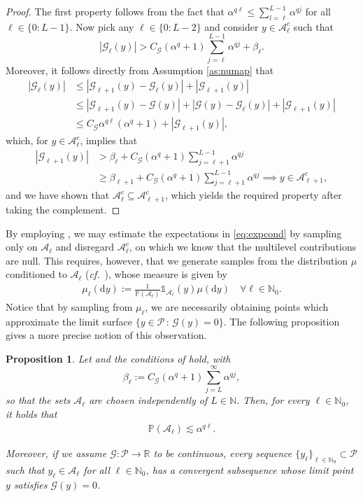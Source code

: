 \documentclass{article}
\newtheorem{proposition}[theorem]{Proposition}
\newcommand{\cA}{\mathcal{A}}
\newcommand{\cG}{\mathcal{G}}
\newcommand{\cP}{\mathcal{P}}
\newcommand{\IN}{\mathbb{N}}
\newcommand{\IP}{\mathbb{P}}
\newcommand{\IR}{\mathbb{R}}
\newcommand{\bOne}{\mathds{1}}
\renewcommand{\d}{{\text{d}}}
\newcommand{\abs}[1]{{\left\vert #1 \right\vert}}
\theoremstyle{definition}
\begin{document}
\begin{proof}
  The first property follows from the fact that $\alpha^{q\ell}\leq\sum_{l=\ell}^{L-1}\alpha^{qj}$ for all $\ell\in\{0:L-1\}$.
  Now pick any $\ell\in\{0:L-2\}$ and consider $y\in\cA_\ell^c$ such that $$\abs{\cG_{\ell}(y)}>C_\cG(\alpha^q+1)\sum_{j=\ell}^{L-1}\alpha^{qj}+\beta_\ell.$$
  Moreover, it follows directly from Assumption \ref{as:numap} that
  \begin{align*}
    \abs{\cG_{\ell}(y)}
    &\leq\abs{\cG_{\ell+1}(y)-\cG_{\ell}(y)}+\abs{\cG_{\ell+1}(y)}\\
    &\leq\abs{\cG_{\ell+1}(y)-\cG(y)}+\abs{\cG(y)-\cG_{\ell}(y)}+\abs{\cG_{\ell+1}(y)}\\
    &\leq C_\cG\alpha^{q\ell}(\alpha^{q}+1)+\abs{\cG_{\ell+1}(y)},
  \end{align*}
  which, for $y \in \mathcal{A}_\ell^c$, implies that
  \begin{align*}
    \abs{\cG_{\ell+1}(y)} &> \beta_{\ell} + C_\cG(\alpha^q+1)\sum\limits_{j=\ell+1}^{L-1}\alpha^{qj}\\
                          &\geq \beta_{\ell+1} + C_\cG(\alpha^q+1)\sum\limits_{j=\ell+1}^{L-1}\alpha^{qj}\implies y\in\cA_{\ell+1}^c,
  \end{align*}
  and we have shown that $\cA_{\ell}^c\subseteq\cA_{\ell+1}^c$, which yields the required property after taking
  the complement.
\end{proof}

By employing , we may estimate the expectations in \cref{eq:expcond}
by sampling only on $\cA_\ell$ and disregard $\cA_\ell^c$, on which we know that the multilevel contributions
are null. This requires, however, that we generate samples from the distribution $\mu$ conditioned to $\mathcal{A}_\ell$
(\emph{cf.}~\cite[Sect.~2.1]{cerouSequentialMonteCarlo2012}), whose measure is given by
\begin{align}
  \label{eq:condMeas}
  \mu_\ell(\d y):=\frac{1}{\IP(\cA_\ell)}\bOne_{\cA_\ell}(y)\mu(\d y)\quad\forall\ell\in\IN_0.
\end{align}
Notice that by sampling from $\mu_\ell$, we are necessarily obtaining points which approximate the limit surface $\{y\in\cP\,:\,\cG(y)=0\}$. The following proposition gives a more precise notion of this observation.

\begin{proposition}
  \label{prop:accum}
  Let  and the conditions of  hold, with
  $$\beta_\ell:= C_\cG(\alpha^q+1)\sum\limits_{j=L}^{\infty}\alpha^{qj},$$
  so that the sets $\cA_\ell$ are chosen independently of $L\in\IN$.
  Then, for every $\ell\in\IN_0$, it holds that
  \begin{align*}
    \IP(\cA_\ell)\lesssim\alpha^{q\ell}.
  \end{align*}
  
  Moreover, if we assume $\cG:\cP\to\IR$ to be continuous, every sequence $\{y_\ell\}_{\ell\in\IN_0}\subset\cP$
  such that $y_\ell\in\cA_\ell$ for all $\ell\in\IN_0$, has a convergent subsequence whose limit point $y$
  satisfies $\cG(y)=0$.
\end{proposition}
\end{document}
